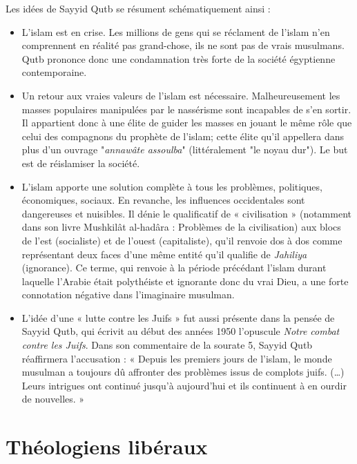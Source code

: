 Les idées de Sayyid Qutb se résument schématiquement ainsi :
\begin{itemize}
    \item 
L'islam est en crise. Les millions de gens qui se réclament de l'islam n'en comprennent en réalité pas grand-chose, ils ne sont pas de vrais musulmans. Qutb prononce donc une condamnation très forte de la société égyptienne contemporaine.
  \item 
Un retour aux vraies valeurs de l'islam est nécessaire. Malheureusement les masses populaires manipulées par le nassérisme sont incapables de s’en sortir. Il appartient donc à une élite de guider les masses en jouant le même rôle que celui des compagnons du prophète de l'islam; cette élite qu'il appellera dans plus d'un ouvrage "\textit{annawâte assoulba}" (littéralement "le noyau dur"). Le but est de réislamiser la société.
  \item 
L'islam apporte une solution complète à tous les problèmes, politiques, économiques, sociaux. En revanche, les influences occidentales sont dangereuses et nuisibles. Il dénie le qualificatif de « civilisation » (notamment dans son livre Mushkilât al-hadâra : Problèmes de la civilisation) aux blocs de l'est (socialiste) et de l'ouest (capitaliste), qu'il renvoie dos à dos comme représentant deux faces d'une même entité qu'il qualifie de \textit{Jahiliya} (ignorance). Ce terme, qui renvoie à la période précédant l'islam durant laquelle l'Arabie était polythéiste et ignorante donc du vrai Dieu, a une forte connotation négative dans l'imaginaire musulman.
  \item 
L'idée d'une « lutte contre les Juifs » fut aussi présente dans la pensée de Sayyid Qutb, qui écrivit au début des années 1950 l'opuscule \textit{Notre combat contre les Juifs}. Dans son commentaire de la sourate 5, Sayyid Qutb réaffirmera l’accusation : « Depuis les premiers jours de l’islam, le monde musulman a toujours dû affronter des problèmes issus de complots juifs. (…) Leurs intrigues ont continué jusqu’à aujourd’hui et ils continuent à en ourdir de nouvelles. » 
\end{itemize}

\section{Théologiens libéraux}

